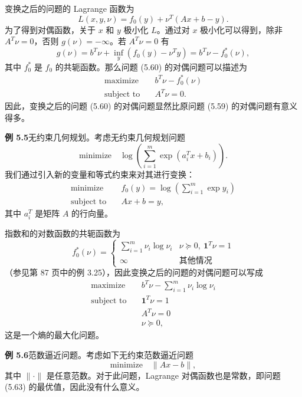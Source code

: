\documentclass[UTF8,12pt,a4paper,fontset=fandol]{ctexart}
\begin{document}
变换之后的问题的 Lagrange 函数为
\[
L(x,y,\nu)=f_0(y)+\nu^T(Ax+b-y).
\]
为了得到对偶函数，关于 $x$ 和 $y$ 极小化 $L$。通过对 $x$ 极小化可以得到，除非 $A^T\nu=0$，否则 $g(\nu)=-\infty$。若 $A^T\nu=0$ 有
\[
g(\nu)=b^T\nu+\inf_y(f_0(y)-\nu^Ty)=b^T\nu-f_0^\ast(\nu),
\]
其中 $f_0^\ast$ 是 $f_0$ 的共轭函数。那么问题 (5.60) 的对偶问题可以描述为
\begin{equation}
\begin{aligned}
\text{maximize}\quad & b^T\nu-f_0^\ast(\nu)\\
\text{subject to}\quad & A^T\nu=0.
\end{aligned}
\tag{5.61}
\end{equation}
因此，变换之后的问题 (5.60) 的对偶问题显然比原问题 (5.59) 的对偶问题有意义得多。

\noindent\textbf{例 5.5}\quad 无约束几何规划。考虑无约束几何规划问题
\[
\text{minimize}\quad \log\left(\sum_{i=1}^m\exp(a_i^Tx+b_i)\right).
\]
我们通过引入新的变量和等式约束来对其进行变换：
\[
\begin{aligned}
\text{minimize}\quad & f_0(y)=\log\left(\sum_{i=1}^m\exp y_i\right)\\
\text{subject to}\quad & Ax+b=y,
\end{aligned}
\]
其中 $a_i^T$ 是矩阵 $A$ 的行向量。

指数和的对数函数的共轭函数为
\[
f_0^\ast(\nu)=
\begin{cases}
\sum_{i=1}^m\nu_i\log\nu_i & \nu\succeq 0,\ \mathbf{1}^T\nu=1\\
\infty & \text{其他情况}
\end{cases}
\]
（参见第 87 页中的例 3.25），因此变换之后的问题的对偶问题可以写成
\begin{equation}
\begin{aligned}
\text{maximize}\quad & b^T\nu-\sum_{i=1}^m\nu_i\log\nu_i\\
\text{subject to}\quad & \mathbf{1}^T\nu=1\\
& A^T\nu=0\\
& \nu\succeq 0,
\end{aligned}
\tag{5.62}
\end{equation}
这是一个熵的最大化问题。

\noindent\textbf{例 5.6}\quad 范数逼近问题。考虑如下无约束范数逼近问题
\begin{equation}
\text{minimize}\quad \|Ax-b\|,
\tag{5.63}
\end{equation}
其中 $\|\cdot\|$ 是任意范数。对于此问题，Lagrange 对偶函数也是常数，即问题 (5.63) 的最优值，因此没有什么意义。
\end{document}
